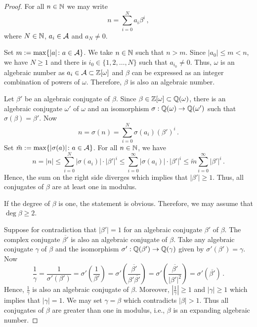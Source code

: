 \begin{proof}
For all $n\in\mathbb{N}$ we may write 
    $$
    n=\sum_{i=0}^{N}a_i\beta^i\,,
    $$
    where $N\in\mathbb{N}$, $a_i\in\mathcal{A}$ and $a_N\neq 0$.
    
    Set $m:= \max\{|a|\colon a\in\mathcal{A}\}$. We take $n\in\mathbb{N}$ such that $n>m$. 
    Since $|a_0|\leq m<n$, we have  $N\geq 1$ and there is $i_0 \in \{1,2,\dots,N\}$ such that $a_{i_0}\neq 0$. Thus, $\omega$ is an algebraic number as $a_i\in\mathcal{A}\subset\mathbb{Z}[\omega]$ and $\beta$ can be expressed as an integer combination of powers of $\omega$. Therefore, $\beta$ is also an algebraic number.
    
    Let $\beta'$ be an algebraic conjugate of $\beta$.  
    Since $\beta\in\mathbb{Z}[\omega]\subset\mathbb{Q}(\omega)$, there is an algebraic conjugate $\omega'$ of $\omega$ and an isomorphism $\sigma: \mathbb{Q}(\omega)\rightarrow \mathbb{Q}(\omega')$ such that $\sigma(\beta)=\beta'$. Now 
    $$
    n=\sigma(n)=\sum_{i=0}^{N}\sigma(a_i)(\beta')^i\,.
    $$
    Set $\tilde m:= \max\{|\sigma(a)|\colon a\in\mathcal{A}\}$.  For all $n\in\mathbb{N}$, we have 
    $$
    n=|n|\leq\sum_{i=0}^{N}|\sigma(a_i)|\cdot|\beta'|^i \leq \sum_{i=0}^{\infty}|\sigma(a_i)|\cdot|\beta'|^i \leq \tilde m\sum_{i=0}^{\infty}|\beta'|^i\,.  
    $$
    Hence, the sum on the right  side diverges which implies that $|\beta'|\geq 1$. Thus, all conjugates of $\beta$ are at least one in modulus.
    
    If the degree of $\beta$ is one, the statement is obvious.  Therefore, we may assume that $\deg \beta \geq 2$. 
    
    Suppose  for contradiction that $|\beta'|=1$ for an algebraic conjugate $\beta'$  of $\beta$. The complex conjugate $\overline{\beta'}$ is also an algebraic conjugate of $\beta$. Take any algebraic conjugate $\gamma$ of $\beta$ and the isomorphism $\sigma': \mathbb{Q}(\beta')\rightarrow \mathbb{Q}(\gamma)$ given by $\sigma'(\beta')=\gamma$.
    Now
    $$
    \frac{1}{\gamma}=\frac{1}{\sigma'(\beta')}=\sigma'\left(\frac{1}{\beta'}\right)=\sigma'\left(\frac{\overline{\beta'}}{\beta'\overline{\beta'}}\right)=\sigma'\left(\frac{\overline{\beta'}}{|\beta'|^2}\right)=\sigma'(\overline{\beta'})\,.
    $$
    Hence, $\frac{1}{\gamma}$ is also an algebraic conjugate of $\beta$. Moreover, $\left|\frac{1}{\gamma}\right|\geq 1$ and $|\gamma|\geq 1$ which implies that $|\gamma|=1$. We may set $\gamma=\beta$ which contradicts $|\beta|>1$. Thus all conjugates of $\beta$ are greater than one in modulus, i.e., $\beta$ is an expanding algebraic number.
\end{proof}


